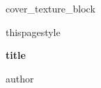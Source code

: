 {{cover_texture_block}}
\begin{titlepage}
\csname thispagestyle
  \centering
  \vspace*{\fill}
  {\Huge \textbf{{{title}}}\par}
  \vspace{12mm}
  {\Large {{{author}}}\par}
  \vspace*{\fill}
\end{titlepage}
